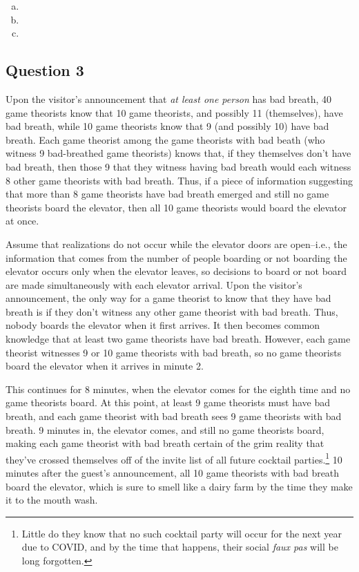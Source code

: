 \documentclass{article}
\begin{document}
\begin{enumerate}[(a)]
\begin{enumerate}[(i)]
		\end{enumerate}
	
	
	\item 
	
	
	\item 
	
	
	\item 
	
	
\end{enumerate}


\subsection*{Question 3}
Upon the visitor's announcement that \textit{at least one person} has bad breath, 40 game theorists know that 10 game theorists, and possibly 11 (themselves), have bad breath, while 10 game theorists know that 9 (and possibly 10) have bad breath. Each game theorist among the game theorists with bad beath (who witness 9 bad-breathed game theorists) knows that, if they themselves don't have bad breath, then those 9 that they witness having bad breath would each witness 8 other game theorists with bad breath. Thus, if a piece of information suggesting that more than 8 game theorists have bad breath emerged and still no game theorists board the elevator, then all 10 game theorists would board the elevator at once.

Assume that realizations do not occur while the elevator doors are open--i.e., the information that comes from the number of people boarding or not boarding the elevator occurs only when the elevator leaves, so decisions to board or not board are made simultaneously with each elevator arrival. Upon the visitor's announcement, the only way for a game theorist to know that they have bad breath is if they don't witness any other game theorist with bad breath. Thus, nobody boards the elevator when it first arrives. It then becomes common knowledge that at least two game theorists have bad breath. However, each game theorist witnesses 9 or 10 game theorists with bad breath, so no game theorists board the elevator when it arrives in minute 2. 

This continues for 8 minutes, when the elevator comes for the eighth time and no game theorists board. At this point, at least 9 game theorists must have bad breath, and each game theorist with bad breath sees 9 game theorists with bad breath. 9 minutes in, the elevator comes, and still no game theorists board, making each game theorist with bad breath certain of the grim reality that they've crossed themselves off of the invite list of all future cocktail parties.\footnote{Little do they know that no such cocktail party will occur for the next year due to COVID, and by the time that happens, their social \textit{faux pas} will be long forgotten.} 10 minutes after the guest's announcement, all 10 game theorists with bad breath board the elevator, which is sure to smell like a dairy farm by the time they make it to the mouth wash.
\end{document}
